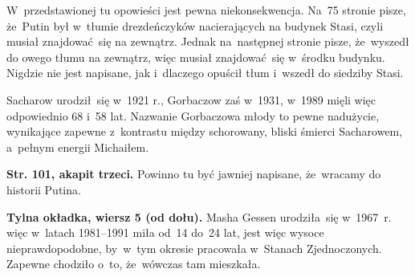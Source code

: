\documentclass[a4paper,11pt]{article}
\numberwithin{equation}{section}
\begin{document}
\VerSpaceFour





\noindent
{} W~przedstawionej tu opowieści jest pewna niekonsekwencja. Na~75
stronie pisze, że~Putin był w~tłumie drezdeńczyków nacierających na budynek
Stasi, czyli musiał znajdować~się na zewnątrz. Jednak na~następnej stronie
pisze, że~wyszedł do owego tłumu na zewnątrz, więc musiał znajdować~się
w~środku budynku. Nigdzie nie jest napisane, jak i~dlaczego opuścił
tłum i~wszedł do siedziby Stasi.

\VerSpaceFour





\noindent
{} Sacharow urodził~się w~1921 r., Gorbaczow zaś w~1931, w~1989 mięli
więc odpowiednio 68 i~58 lat. Nazwanie Gorbaczowa młody to pewne nadużycie,
wynikające zapewne z~kontrastu między schorowany, bliski śmierci
Sacharowem, a~pełnym energii Michaiłem.

\VerSpaceFour





\noindent
\textbf{Str. 101, akapit trzeci.} Powinno tu być jawniej napisane,
że~wracamy do historii Putina.

\VerSpaceFour





\noindent
\textbf{Tylna okładka, wiersz 5 (od dołu).} Masha Gessen urodziła~się
w~1967~r. więc w~latach 1981--1991 miła od~14 do~24 lat, jest więc wysoce
nieprawdopodobne, by~w~tym okresie pracowała w~Stanach Zjednoczonych.
Zapewne chodziło o~to, że~wówczas tam mieszkała.





\newpage

\end{document}
